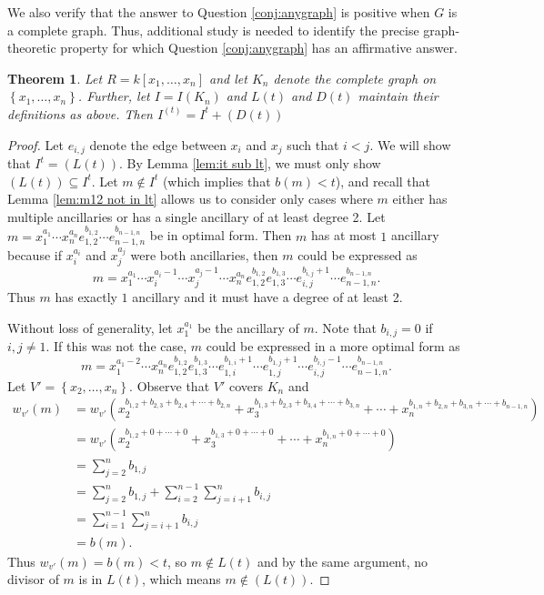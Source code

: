 \documentclass[12pt]{amsart}
\def\set#1{\left\{ {#1} \right\}}
\renewcommand{\geq}{\geqslant}
\theoremstyle{plain}
\newtheorem{theorem}{Theorem}[section]
\theoremstyle{definition}
\begin{document}
We also verify that the answer to Question \ref{conj:anygraph} is positive when $G$ is a complete graph.
Thus, additional study is needed to identify the precise graph-theoretic property for which Question \ref{conj:anygraph} has an affirmative answer.

\begin{theorem}
  Let $R=k[x_1,\ldots,x_n]$ and let $K_n$ denote the complete graph on $\set{x_1,\ldots,x_n}$. 
  Further, let $I=I(K_n)$ and $L(t)$ and $D(t)$ maintain their definitions as above. Then $I^{(t)} = I^t + (D(t))$
\end{theorem}

\begin{proof}
  Let $e_{i,j}$ denote the edge between $x_i$ and $x_j$ such that $i<j$. %
  We will show that $I^t = (L(t))$.
  By Lemma \ref{lem:it sub lt}, we must only show $(L(t))\subseteq I^t$.
  Let $m\not\in I^t$ (which implies that $b(m) < t$), and recall that Lemma \ref{lem:m12 not in lt} allows us to consider only cases where $m$ either has multiple ancillaries or has a single ancillary of at least degree 2. 
  Let $m=x_1^{a_1}\cdots x_n^{a_n}e_{1,2}^{b_{1,2}}\cdots e_{n-1,n}^{b_{n-1,n}}$ be in optimal form. Then $m$ has at most $1$ ancillary because if $x_i^{a_i}$ and $x_j^{a_j}$ were both ancillaries, then $m$ could be expressed as $$m=x_1^{a_1}\cdots x_i^{a_i-1}\cdots x_j^{a_j-1}\cdots x_n^{a_n}e_{1,2}^{b_{1,2}}e_{1,3}^{b_{1,3}}\cdots e_{i,j}^{b_{i,j}+1}\cdots e_{n-1,n}^{b_{n-1,n}}.$$ %
  Thus $m$ has exactly $1$ ancillary and it must have a degree of at least 2.
  
  Without loss of generality, let $x_1^{a_1}$ be the ancillary of $m$. Note that $b_{i,j}=0$ if $i,j\not=1$. If this was not the case, $m$ could be expressed in a more optimal form as $$m=x_1^{a_1-2}\cdots x_n^{a_n}e_{1,2}^{b_{1,2}}e_{1,3}^{b_{1,3}}\cdots e_{1,i}^{b_{1,i}+1}\cdots e_{1,j}^{b_{1,j}+1}\cdots e_{i,j}^{b_{i,j}-1}\cdots e_{n-1,n}^{b_{n-1,n}}.$$
  Let $V' = \set{x_2,\ldots, x_n}$. 
  Observe that $V'$ covers $K_n$ and
\begin{align*}
  w_{v'}(m) &= w_{v'}(x_2^{b_{1,2}+b_{2,3}+b_{2,4}+\cdots+b_{2,n}} + x_3^{b_{1,3}+b_{2,3}+b_{3,4}+\cdots+b_{3,n}} + \cdots + x_n^{b_{1,n}+b_{2,n}+b_{3,n}+\cdots+b_{n-1,n}}) \\
  &= w_{v'}(x_2^{b_{1,2}+0+\cdots+0} + x_3^{b_{1,3}+0+\cdots+0} + \cdots + x_n^{b_{1,n}+0+\cdots+0}) \\
  &= \sum_{j=2}^n b_{1,j} \\
  &= \sum_{j=2}^n b_{1,j} + \sum_{i=2}^{n-1}\sum_{j=i+1}^n b_{i,j} \\
  &= \sum_{i=1}^{n-1}\sum_{j=i+1}^n b_{i,j} \\
  &= b(m).
\end{align*}
Thus $w_{v'}(m) = b(m) < t$, so $m \not\in L(t)$ and by the same argument, no divisor of $m$ is in $L(t)$, which means $m \not\in (L(t))$. 


\end{proof}
\end{document}
